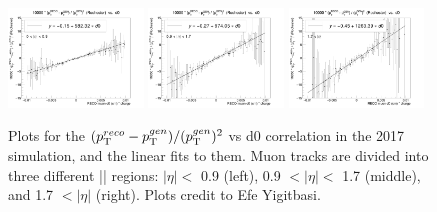 \begin{figure}[!htb]
      \centering
      \captionsetup{justification=justified}
      \includegraphics[width=0.32\textwidth]{pics/muon_corr/GeoFit/fit_results/2017_DY_eta_0_0p9_dRelPt2p0_Roch.png}
      \includegraphics[width=0.32\textwidth]{pics/muon_corr/GeoFit/fit_results/2017_DY_eta_0p9_1p7_dRelPt2p0_Roch.png}
      \includegraphics[width=0.32\textwidth]{pics/muon_corr/GeoFit/fit_results/2017_DY_eta_1p7_inf_dRelPt2p0_Roch.png}
      \caption{Plots for the $(p_{\mathrm{T}}^{reco}-p_{\mathrm{T}}^{gen})/ (p_{\mathrm{T}}^{gen})^{2}$ vs d0 correlation in the 2017 \DY simulation, 
               and the linear fits to them. Muon tracks are divided into three different |\eta| regions:
               $|\eta| <$ 0.9 (left), 0.9 $< |\eta| <$ 1.7 (middle), and 1.7 $< |\eta|$ (right).
               Plots credit to Efe Yigitbasi.}
      \label{fig:geofit_param_2017}
\end{figure}

